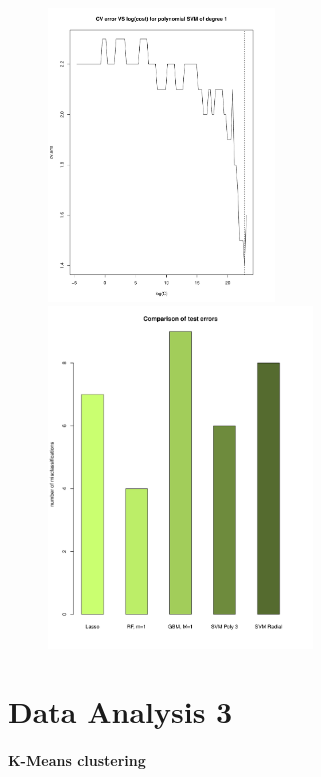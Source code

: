 \documentclass{article}
\begin{document}
\begin{figure}[h]				%
	\centering
	\includegraphics[width=6cm]{DA2/Plots/SVM_CVerr_VS_logC.pdf}
	\includegraphics[width=7cm]{DA2/Plots/Testerr_Comparison.pdf}
	\caption{}
\end{figure}


\section*{Data Analysis 3}
\paragraph{K-Means clustering}
\end{document}
